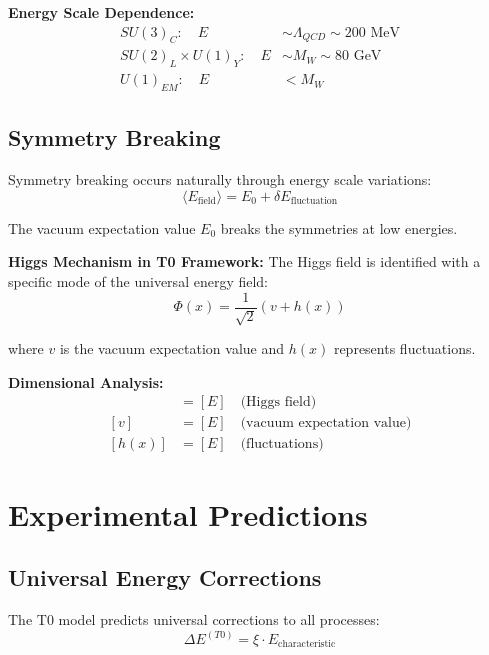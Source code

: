 \documentclass[12pt,a4paper]{report}
\begin{document}
	\textbf{Energy Scale Dependence:}
	\begin{align}
		SU(3)_C: \quad E &\sim \Lambda_{QCD} \sim 200 \text{ MeV} \\
		SU(2)_L \times U(1)_Y: \quad E &\sim M_W \sim 80 \text{ GeV} \\
		U(1)_{EM}: \quad E &< M_W
	\end{align}
	
	\subsection{Symmetry Breaking}
	\label{subsec:symmetry_breaking}
	
	Symmetry breaking occurs naturally through energy scale variations:
	\begin{equation}
		\langle E_{\text{field}} \rangle = E_0 + \delta E_{\text{fluctuation}}
	\end{equation}
	
	The vacuum expectation value $E_0$ breaks the symmetries at low energies.
	
	\textbf{Higgs Mechanism in T0 Framework:}
	The Higgs field is identified with a specific mode of the universal energy field:
	\begin{equation}
		\Phi(x) = \frac{1}{\sqrt{2}}(v + h(x))
	\end{equation}
	
	where $v$ is the vacuum expectation value and $h(x)$ represents fluctuations.
	
	\textbf{Dimensional Analysis:}
	\begin{align}
		[\Phi] &= [E] \quad \text{(Higgs field)} \\
		[v] &= [E] \quad \text{(vacuum expectation value)} \\
		[h(x)] &= [E] \quad \text{(fluctuations)}
	\end{align}
	
	\section{Experimental Predictions}
	\label{sec:experimental_predictions}
	
	\subsection{Universal Energy Corrections}
	\label{subsec:universal_energy_corrections}
	
	The T0 model predicts universal corrections to all processes:
	\begin{equation}
		\Delta E^{(T0)} = \xi \cdot E_{\text{characteristic}}
	\end{equation}
	
\end{document}
